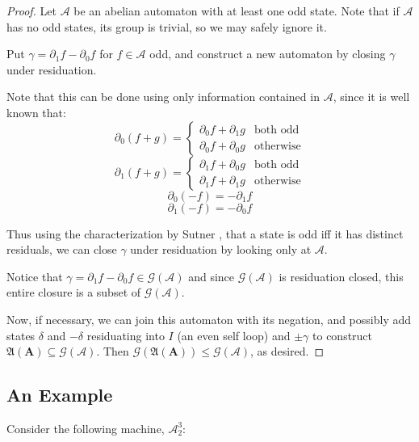 \documentclass[12pt]{article}
\newcommand{\A}{\mathcal{A}}
\newcommand{\G}{\mathcal{G}}
\renewcommand{\P}{\mathfrak{A}}
\newcommand{\2}{\textbf{2}}
\newcommand{\Am}{\textbf{A}}
\newcommand{\del}{\partial}
\begin{document}
\begin{proof}
  Let $\A$ be an abelian automaton with at least one odd state.
  Note that if $\A$ has no odd states, its group is trivial, so we may
  safely ignore it.

  Put $\gamma = \del_1 f - \del_0 f$ for $f \in \A$ odd, and construct
  a new automaton by closing $\gamma$ under residuation.

  Note that this can be done using only information contained in $\A$,
  since it is well known that:
  \[
    \del_0(f + g) = \begin{cases} \del_0 f + \del_1 g & \text{both odd}\\
                                  \del_0 f + \del_0 g & \text{otherwise}
                    \end{cases}
  \]
  \[
    \del_1(f + g) = \begin{cases} \del_1 f + \del_0 g & \text{both odd}\\
                                  \del_1 f + \del_1 g & \text{otherwise}
                    \end{cases}
  \]
  \[
    \del_0 (-f) = - \del_1 f
  \]
  \[
    \del_1 (-f) = - \del_0 f
  \]

  Thus using the characterization by Sutner \cite{Sutner18:abelian_automata}, 
  that a state is odd iff it has distinct residuals, we can close $\gamma$ 
  under residuation by looking only at $\A$.

  Notice that $\gamma = \del_1 f - \del_0 f \in \G(\A)$ and since $\G(\A)$
  is residuation closed, this entire closure is a subset of $\G(\A)$. 

  Now, if necessary, we can join this automaton with its negation, and
  possibly add states $\delta$ and $-\delta$ residuating into $I$
  (an even self loop) and $\pm \gamma$ to construct 
  $\P(\Am) \subseteq \G(\A)$. Then $\G(\P(\Am)) \leq \G(\A)$, as desired.
\end{proof}

\subsection{An Example}
Consider the following machine, $\A^3_2$:
\end{document}
